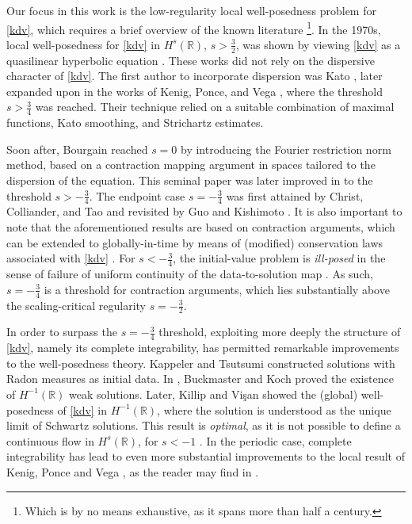 \documentclass[%
11pt,  reqno]{amsart}
\newcommand{\5}{\textup{V}}
\theoremstyle{remark}
\newcommand{\R}{\mathbb{R}}
\numberwithin{equation}{section}
\numberwithin{theorem}{section}
\begin{document}
\medskip

Our focus in this work is the low-regularity local well-posedness problem for \eqref{kdv}, which requires a brief overview of the known literature {\footnote{Which is by no means exhaustive, as it spans more than half a century.}}. In the 1970s, local well-posedness for \eqref{kdv} in $H^s(\R)$, $s>\frac32$, was shown by viewing \eqref{kdv} as a quasilinear hyperbolic equation \cite{BonaSmith, Kato_kdv, SautTemam, TsutsumiMukasa}. These works did not rely on the dispersive character of \eqref{kdv}. The first {author} to incorporate dispersion was Kato \cite{Kato_kdv_disp}, later expanded upon in the works of Kenig, Ponce, and Vega \cite{KPV91, KPV_gkdv}, where {the threshold $s>\frac34$ was reached}. Their technique relied on a suitable combination of maximal functions, Kato smoothing, and Strichartz estimates. 

\medskip


Soon after, Bourgain \cite{bourg2} reached $s=0$ by introducing the Fourier restriction norm method, 
based on a contraction mapping argument in spaces tailored to the dispersion of the equation. This seminal paper was later improved in \cite{kpv_bilin} to the threshold $s>-\frac34$. The endpoint case $s=-\frac34$ was first attained by Christ, Colliander, and Tao \cite{CCT_ill} and revisited by Guo \cite{Guo_gwp} and Kishimoto \cite{Kishimoto_lwp_crit}. It is also important to note that the aforementioned results are based on contraction arguments, which can be extended to globally-in-time by means 
 of (modified) conservation laws associated with \eqref{kdv}  \cite{bourg2, CKSTT_sharp_kdv, Guo_gwp}. For $s<-\frac34$, the initial-value problem is \emph{ill-posed} in the sense of failure of uniform continuity of the data-to-solution map \cite{KPV_ill}. As such, $s=-\frac34$ is a threshold for contraction arguments, which lies substantially above the 
scaling-critical regularity $s=-\frac32$. 



\medskip

In order to surpass the $s=-\frac34$ threshold, exploiting more deeply the structure of \eqref{kdv}, namely its complete integrability, has 
permitted remarkable improvements to the well-posedness theory. Kappeler \cite{Kappeler_rough} and Tsutsumi \cite{Tsutsumi_kdv_measures} constructed solutions with Radon measures as initial data. In \cite{BuckmasterKoch}, Buckmaster and Koch proved the existence of $H^{-1}(\R)$ weak solutions. Later, Killip and Vi\c{s}an \cite{KillipVisan_kdv} showed the (global) well-posedness of \eqref{kdv} in $H^{-1}(\R)$, where the solution is understood as the unique limit of Schwartz solutions. This result is \emph{optimal}, as it is not possible to define a continuous flow in $H^s(\R)$, for $s<-1$ \cite{Molinet_ill_line}. In the periodic case, complete integrability has lead to even more substantial improvements to the  local result of Kenig, Ponce and Vega \cite{kpv_bilin}, {as the reader may find in }\cite{KMMT16, KappelerMolnar18, KT06, KillipVisan_kdv}.
\end{document}
